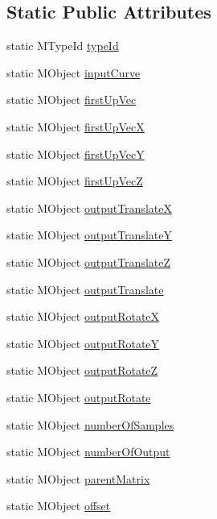 \subsection*{Static Public Attributes}
\begin{DoxyCompactItemize}
\item 
static M\-Type\-Id \hyperlink{class_m_g__spline_path_aff30815f4dc3c17f42cfb5707069e478}{type\-Id}
\item 
static M\-Object \hyperlink{class_m_g__spline_path_a553b49d795fe24494b5d6861f49c41b4}{input\-Curve}
\item 
static M\-Object \hyperlink{class_m_g__spline_path_acc388654e041e9b08f17a18756555330}{first\-Up\-Vec}
\item 
static M\-Object \hyperlink{class_m_g__spline_path_a64b96e5a494c4a404fa6ccfc5915ec00}{first\-Up\-Vec\-X}
\item 
static M\-Object \hyperlink{class_m_g__spline_path_ab398b0e9a0b111e9cbc4aaf884bce623}{first\-Up\-Vec\-Y}
\item 
static M\-Object \hyperlink{class_m_g__spline_path_ad16313a0a646376392bd5414083a41cf}{first\-Up\-Vec\-Z}
\item 
static M\-Object \hyperlink{class_m_g__spline_path_a7b3702461b7793b0100deedfdf062daa}{output\-Translate\-X}
\item 
static M\-Object \hyperlink{class_m_g__spline_path_a8384dcde6a55dfbefc90e39bbf466f31}{output\-Translate\-Y}
\item 
static M\-Object \hyperlink{class_m_g__spline_path_a27a87348d64922cc593395b5eeb06d62}{output\-Translate\-Z}
\item 
static M\-Object \hyperlink{class_m_g__spline_path_a7cd73c49d392f6a01c98b094c376180b}{output\-Translate}
\item 
static M\-Object \hyperlink{class_m_g__spline_path_aa91a8ca94034b2565de8f19809836f91}{output\-Rotate\-X}
\item 
static M\-Object \hyperlink{class_m_g__spline_path_a1f09258c7e2be297cda96d1f68dcb8d3}{output\-Rotate\-Y}
\item 
static M\-Object \hyperlink{class_m_g__spline_path_a315a706b9954548e9163ff578deaffe8}{output\-Rotate\-Z}
\item 
static M\-Object \hyperlink{class_m_g__spline_path_abf44c1e8fbd1d839310e21c7d423344c}{output\-Rotate}
\item 
static M\-Object \hyperlink{class_m_g__spline_path_a97e85208d383234fe180c6a6bfd18e97}{number\-Of\-Samples}
\item 
static M\-Object \hyperlink{class_m_g__spline_path_a494bdb0e752130afd6fac3a170a5ffe1}{number\-Of\-Output}
\item 
static M\-Object \hyperlink{class_m_g__spline_path_a88eb65ce7530bf0ec2bbd3e371a58d51}{parent\-Matrix}
\item 
static M\-Object \hyperlink{class_m_g__spline_path_a2a916661aacb9aa85aeffdbadbaee625}{offset}
\end{DoxyCompactItemize}


